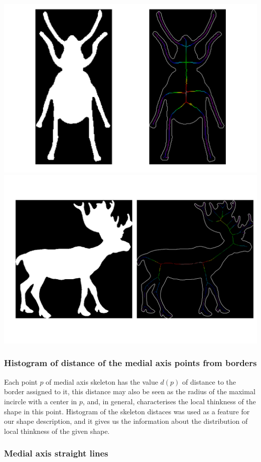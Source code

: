 \documentclass[12pt]{article}
\begin{document}
\includegraphics[scale=0.25]{beetle_281.png}
\includegraphics[scale=0.25]{deer_79.png}

\subsubsection{Histogram of distance of the medial axis points from borders}

Each point $p$ of medial axis skeleton has the value $d(p)$ of distance to the border  assigned to it, this distance may also be seen as the radius of the maximal incircle with a center in $p$, and, in general, characterises the local thinkness of the shape in this point. Histogram of the skeleton distaces was used as a feature for our shape description, and it gives us the information about the distribution of local thinkness of the given shape.

\subsubsection{Medial axis straight lines}
\end{document}
